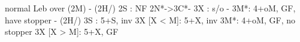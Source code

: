 normal Leb over (2M) - 
(2H/) 2S : NF
2N*->3C*- 3X : s/o
        - 3M*: 4+oM, GF, have stopper
        - (2H/) 3S : 5+S, inv
3X [X < M]: 5+X, inv
3M*: 4+oM, GF, no stopper
3X [X > M]: 5+X, GF
